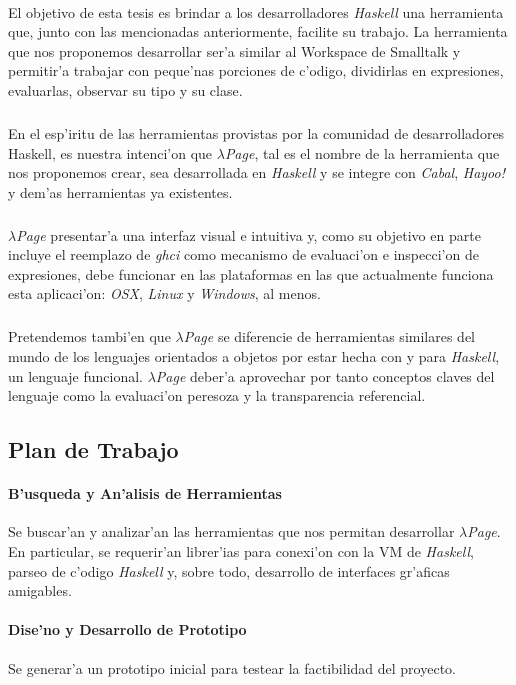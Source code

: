 \documentclass[a4paper]{article}
\begin{document}
\paragraph{}El objetivo de esta tesis es brindar a los desarrolladores \textit{Haskell} una herramienta que, junto con las mencionadas anteriormente, facilite su trabajo.  La herramienta que nos proponemos desarrollar ser'a similar al Workspace de Smalltalk y permitir'a trabajar con peque'nas porciones de c'odigo, dividirlas en expresiones, evaluarlas, observar su tipo y su clase.
\subparagraph{}En el esp'iritu de las herramientas provistas por la comunidad de desarrolladores Haskell, es nuestra intenci'on que \textsl{$\lambda$Page}, tal es el nombre de la herramienta que nos proponemos crear, sea desarrollada en \textit{Haskell} y se integre con \textsl{Cabal}, \textsl{Hayoo!} y dem'as herramientas ya existentes.
\subparagraph{} \textsl{$\lambda$Page} presentar'a una interfaz visual e intuitiva y, como su
 objetivo en parte incluye el reemplazo de \textsl{ghci} como mecanismo de evaluaci'on e  
 inspecci'on de expresiones, debe funcionar en las plataformas en las que actualmente funciona 
 esta aplicaci'on: \textsl{OSX}, \textsl{Linux} y \textsl{Windows}, al menos.
\subparagraph{}Pretendemos tambi'en que \textsl{$\lambda$Page} se diferencie de herramientas similares del mundo de los lenguajes orientados a objetos por estar hecha con y para \textit{Haskell}, un lenguaje funcional.  \textsl{$\lambda$Page} deber'a aprovechar por tanto conceptos claves del lenguaje como la evaluaci'on peresoza y la transparencia referencial.

\subsection{Plan de Trabajo}
\paragraph{B'usqueda y An'alisis de Herramientas} Se buscar'an y analizar'an las herramientas que nos permitan desarrollar \textsl{$\lambda$Page}.  En particular, se requerir'an librer'ias para conexi'on con la VM de \textit{Haskell}, parseo de c'odigo \textit{Haskell} y, sobre todo, desarrollo de interfaces gr'aficas amigables.
\paragraph{Dise'no y Desarrollo de Prototipo} Se generar'a un prototipo inicial para testear la factibilidad del proyecto.
\end{document}
